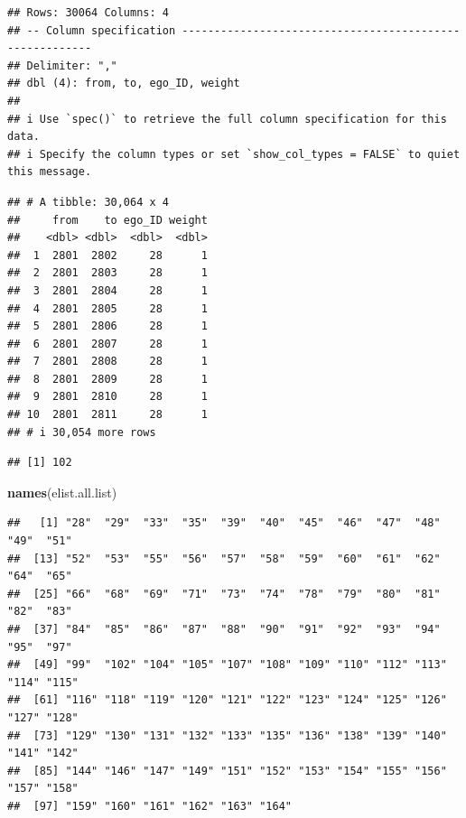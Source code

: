 \documentclass[
]{book}
\newenvironment{Shaded}{\begin{snugshade}}{\end{snugshade}}
\newcommand{\AttributeTok}[1]{\textcolor[rgb]{0.13,0.29,0.53}{#1}}
\newcommand{\CommentTok}[1]{\textcolor[rgb]{0.56,0.35,0.01}{\textit{#1}}}
\newcommand{\FunctionTok}[1]{\textcolor[rgb]{0.13,0.29,0.53}{\textbf{#1}}}
\newcommand{\NormalTok}[1]{#1}
\newcommand{\OtherTok}[1]{\textcolor[rgb]{0.56,0.35,0.01}{#1}}
\newcommand{\SpecialCharTok}[1]{\textcolor[rgb]{0.81,0.36,0.00}{\textbf{#1}}}
\begin{document}
\begin{verbatim}
## Rows: 30064 Columns: 4
## -- Column specification --------------------------------------------------------
## Delimiter: ","
## dbl (4): from, to, ego_ID, weight
## 
## i Use `spec()` to retrieve the full column specification for this data.
## i Specify the column types or set `show_col_types = FALSE` to quiet this message.
\end{verbatim}

\begin{verbatim}
## # A tibble: 30,064 x 4
##     from    to ego_ID weight
##    <dbl> <dbl>  <dbl>  <dbl>
##  1  2801  2802     28      1
##  2  2801  2803     28      1
##  3  2801  2804     28      1
##  4  2801  2805     28      1
##  5  2801  2806     28      1
##  6  2801  2807     28      1
##  7  2801  2808     28      1
##  8  2801  2809     28      1
##  9  2801  2810     28      1
## 10  2801  2811     28      1
## # i 30,054 more rows
\end{verbatim}

\begin{Shaded}
\end{Shaded}

\begin{verbatim}
## [1] 102
\end{verbatim}

\begin{Shaded}
\begin{Highlighting}[]
\FunctionTok{names}\NormalTok{(elist.all.list)}
\end{Highlighting}
\end{Shaded}

\begin{verbatim}
##   [1] "28"  "29"  "33"  "35"  "39"  "40"  "45"  "46"  "47"  "48"  "49"  "51" 
##  [13] "52"  "53"  "55"  "56"  "57"  "58"  "59"  "60"  "61"  "62"  "64"  "65" 
##  [25] "66"  "68"  "69"  "71"  "73"  "74"  "78"  "79"  "80"  "81"  "82"  "83" 
##  [37] "84"  "85"  "86"  "87"  "88"  "90"  "91"  "92"  "93"  "94"  "95"  "97" 
##  [49] "99"  "102" "104" "105" "107" "108" "109" "110" "112" "113" "114" "115"
##  [61] "116" "118" "119" "120" "121" "122" "123" "124" "125" "126" "127" "128"
##  [73] "129" "130" "131" "132" "133" "135" "136" "138" "139" "140" "141" "142"
##  [85] "144" "146" "147" "149" "151" "152" "153" "154" "155" "156" "157" "158"
##  [97] "159" "160" "161" "162" "163" "164"
\end{verbatim}
\end{document}
